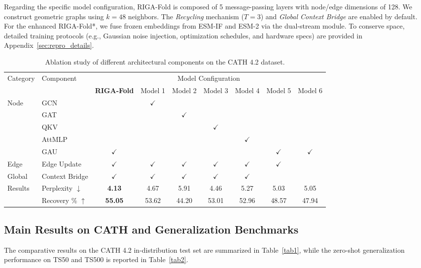 \documentclass{article}
\theoremstyle{plain}
\theoremstyle{definition}
\theoremstyle{remark}
\begin{document}
{Regarding the specific model configuration, RIGA-Fold is composed of 5 message-passing layers with node/edge dimensions of 128. We construct geometric graphs using $k=48$ neighbors. The \textit{Recycling} mechanism ($T=3$) and \textit{Global Context Bridge} are enabled by default. For the enhanced RIGA-Fold*, we fuse frozen embeddings from ESM-IF and ESM-2 via the dual-stream module. To conserve space, detailed training protocols (e.g., Gaussian noise injection, optimization schedules, and hardware specs) are provided in Appendix~\ref{sec:repro_details}.

\begin{table}[t]
\caption{Ablation study of different architectural components on the CATH 4.2 dataset.}
\label{tab:ablation}
\centering
\begin{tabular}{@{}llccccccc@{}}
\toprule
\multirow{2}{*}{Category} & \multirow{2}{*}{Component} & \multicolumn{7}{c}{Model Configuration} \\
\cmidrule(lr){3-9}
 & & \textbf{RIGA-Fold} & Model 1 & Model 2 & Model 3 & Model 4 & Model 5 & Model 6 \\
\midrule
\multirow{5}{*}{Node} & GCN & & $\checkmark$ & & & & & \\
 & GAT & & & $\checkmark$ & & & & \\
 & QKV & & & & $\checkmark$ & & & \\
 & AttMLP & & & & & $\checkmark$ & & \\
 & GAU  & $\checkmark$ & & & & & $\checkmark$ & $\checkmark$ \\
\midrule
Edge & Edge Update & $\checkmark$ & $\checkmark$ & $\checkmark$ & $\checkmark$ & $\checkmark$ & $\checkmark$ & \\
Global & Context Bridge & $\checkmark$ & $\checkmark$ & $\checkmark$ & $\checkmark$ & $\checkmark$ & & \\
\midrule
\multirow{2}{*}{Results} & Perplexity $\downarrow$ & \textbf{4.13} & 4.67 & 5.91 & 4.46 & 5.27 & 5.03 & 5.05\\
 & Recovery \% $\uparrow$ & \textbf{55.05} & 53.62 & 44.20 & 53.01 & 52.96 & 48.57 & 47.94\\
\bottomrule
\end{tabular}
\end{table}
\subsection{Main Results on CATH and Generalization Benchmarks}

The comparative results on the CATH 4.2 in-distribution test set are summarized in Table~\ref{tab1}, while the zero-shot generalization performance on TS50 and TS500 is reported in Table~\ref{tab2}.

}
\end{document}
